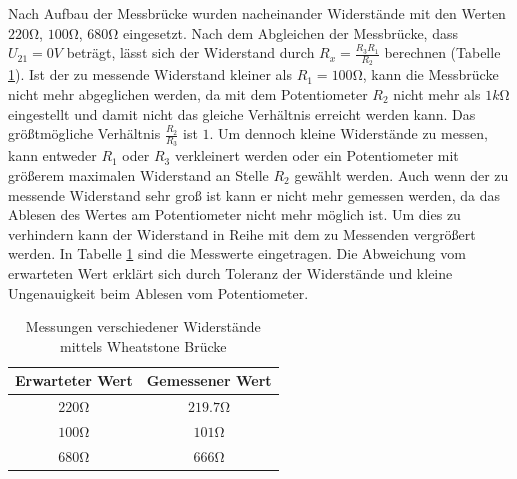 \documentclass[a4paper]{article}
\begin{document}
Nach Aufbau der Messbrücke wurden nacheinander Widerstände mit den Werten $220\si{\ohm}$, $100\si{\ohm}$, $680\si{\ohm}$ eingesetzt.
Nach dem Abgleichen der Messbrücke, dass $U_{21}=0\si{V}$ beträgt, lässt sich der Widerstand durch $R_x=\frac{R_3 R_1}{R_2}$ berechnen (Tabelle \ref{tab:wsbridge}).
Ist der zu messende Widerstand kleiner als $R_1=100\si{\ohm}$, kann die Messbrücke nicht mehr abgeglichen werden, da mit dem Potentiometer $R_2$ nicht mehr als $1\si{k\ohm}$ eingestellt und damit nicht das gleiche Verhältnis erreicht werden kann.
Das größtmögliche Verhältnis $\frac{R_2}{R_3}$ ist $1$. Um dennoch kleine Widerstände zu messen, kann entweder $R_1$ oder $R_3$ verkleinert werden oder ein Potentiometer mit größerem maximalen Widerstand an Stelle $R_2$ gewählt werden.
Auch wenn der zu messende Widerstand sehr groß ist kann er nicht mehr gemessen werden, da das Ablesen des Wertes am Potentiometer nicht mehr möglich ist. Um dies zu verhindern kann der Widerstand in Reihe mit dem zu Messenden vergrößert werden.
In Tabelle \ref{tab:wsbridge} sind die Messwerte eingetragen. Die Abweichung vom erwarteten Wert erklärt sich durch Toleranz der Widerstände und kleine Ungenauigkeit beim Ablesen vom Potentiometer.
\begin{table}[ht]
    \centering
    \begin{tabular}{c|c}
         Erwarteter Wert & Gemessener Wert \\\hline
         $220\si{\ohm}$ & $219.7\si{\ohm}$\\
         $100\si{\ohm}$ & $101\si{\ohm}$\\
         $680\si{\ohm}$ & $666\si{\ohm}$
    \end{tabular}
    \caption{Messungen verschiedener Widerstände mittels Wheatstone Brücke}
    \label{tab:wsbridge}
\end{table}
\end{document}

